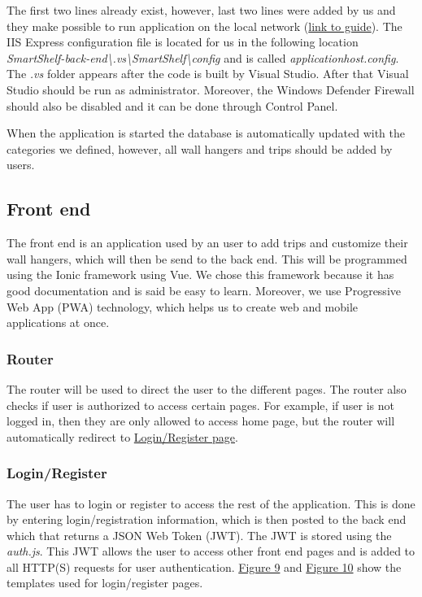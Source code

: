\documentclass{article}
\begin{document}
The first two lines already exist, however, last two lines were added by us and they make possible to run application on the local network (\href{https://mrfields.net/iis-remote-access/}{link to guide}). The IIS Express configuration file is located for us in the following location \textit{SmartShelf-back-end\textbackslash.vs\textbackslash SmartShelf\textbackslash config} and is called \textit{applicationhost.config}. The \textit{.vs} folder appears after the code is built by Visual Studio. After that Visual Studio should be run as administrator. Moreover, the Windows Defender Firewall should also be disabled and it can be done through Control Panel. 

When the application is started the database is automatically updated with the categories we defined, however, all wall hangers and trips should be added by users.

\subsection{Front end}
The front end is an application used by an user to add trips and customize their wall hangers, which will then be send to the back end. This will be programmed using the Ionic framework using Vue\cite{ION}. We chose this framework because it has good documentation and is said be easy to learn. Moreover, we use Progressive Web App (PWA) technology, which helps us to create web and mobile applications at once.

\subsubsection{Router}
The router will be used to direct the user to the different pages. The router also checks if user is authorized to access certain pages. For example, if user is not logged in, then they are only allowed to access home page, but the router will automatically redirect to \hyperref[sec:Login]{Login/Register page}.

\subsubsection{Login/Register}
\label{sec:Login}
The user has to login or register to access the rest of the application. This is done by entering login/registration information, which is then posted to the back end which that returns a JSON Web Token (JWT)\cite{JWT}. The JWT is stored using the \textit{auth.js}. This JWT allows the user to access other front end pages and is added to all HTTP(S) requests for user authentication. \hyperref[fig:login]{Figure 9} and \hyperref[fig:register]{Figure 10} show the templates used for login/register pages.
\end{document}
